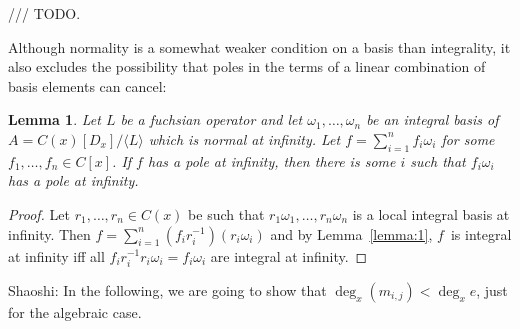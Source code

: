 \documentclass{sig-alternate}
\newtheorem{lemma}[theorem]{Lemma}
\def\<#1>{\langle#1\rangle}
\newcommand{\red}{\color{red}}
\begin{document}
/// TODO.

Although normality is a somewhat weaker condition on a basis than integrality,
it also excludes the possibility that poles in the terms of a linear combination
of basis elements can cancel:

\begin{lemma}\label{lemma:3}
  Let $L$ be a fuchsian operator and let $\omega_1,\dots,\omega_n$ be an integral basis of $A=C(x)[D_x]/\<L>$
  which is normal at infinity.
  Let $f=\sum_{i=1}^n f_i\omega_i$ for some $f_1,\dots,f_n\in C[x]$.
  If $f$ has a pole at infinity, then there is some $i$ such that $f_i\omega_i$ has a pole at infinity.
\end{lemma}
\begin{proof}
  Let $r_1,\dots,r_n\in C(x)$ be such that $r_1\omega_1,\dots,r_n\omega_n$ is a
  local integral basis at infinity. Then $f=\sum_{i=1}^n
  (f_ir_i^{-1})(r_i\omega_i)$ and by Lemma~\ref{lemma:1}, $f$~is integral at infinity iff all
  $f_ir_i^{-1}r_i\omega_i=f_i\omega_i$ are integral at infinity.
\end{proof}


{\red Shaoshi: In the following, we are going to show that $\deg_x(m_{i,j})<\deg_x e$, just for the algebraic case.}
\end{document}
